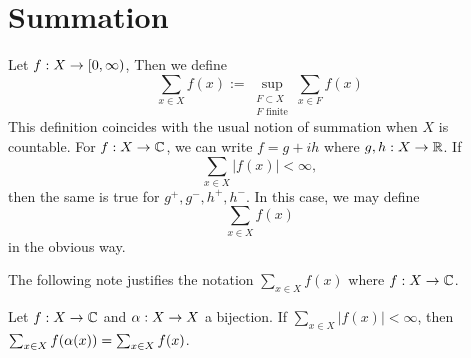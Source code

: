 \documentclass{book}
\begin{document}
 
 
 
 
 
 
 
 
 
 
 
 
 
 
 
 
 
 
 
 
 
 
 
 
 
 
 
 
 
 
 
 
 
 
 
 
 
 
 
 
 
 
 
 
 
 
 
 
 
 
 
 
 
 
 
 
 
 \appendix
 
 \chapter{Summation}
 
 \begin{defn} \ld{}
 	Let $f:X \rightarrow [0,\infty)$, Then we define $$\sum_{x \in X} f(x) := \sup_{\substack{F \subset X \\ F \text{ finite}}} \sum_{x \in F} f(x)$$ This definition coincides with the usual notion of summation when $X$ is countable. For $f:X \rightarrow \mathbb{C}$, we can write $f = g +ih$ where $g,h:X \rightarrow \mathbb{R}$. If $$\sum_{x \in X}|f(x)| < \infty,$$ then the same is true for $g^+,g^-,h^+,h^-$. In this case, we may define $$\sum_{x \in X} f(x)$$ in the obvious way.
 \end{defn} 
 
 The following note justifies the notation $\sum_{x \in X}f(x)$ where $f:X \rightarrow \mathbb{C}$.
 
 \begin{note}
 	Let $f:X \rightarrow \mathbb{C}$ and $\alpha:X \rightarrow X$ a bijection. If $\sum_{x \in X}|f(x)|< \infty$, then $\sum_{x \in X}f( \alpha (x)) = \sum_{x \in X}f(x) $.
 \end{note}
 
\end{document}
